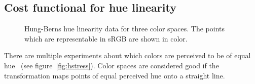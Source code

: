 \documentclass{scrartcl}
\theoremstyle{named}
\begin{document}
\subsection{Cost functional for hue linearity}

\begin{figure}
  \centering
  
  \hfill
  
  \hfill
  
  \caption{Hung-Berns \cite{hung} hue linearity data for three color spaces. The points
  which are representable in sRGB are shown in color.}
\end{figure}

There are multiple experiments about which colors are perceived to be of equal
hue~\cite{hung,ebner,xiao} (see figure~\ref{fig:hstress}). Color spaces are considered
good if the transformation maps points of equal perceived hue onto a straight line.
\end{document}

